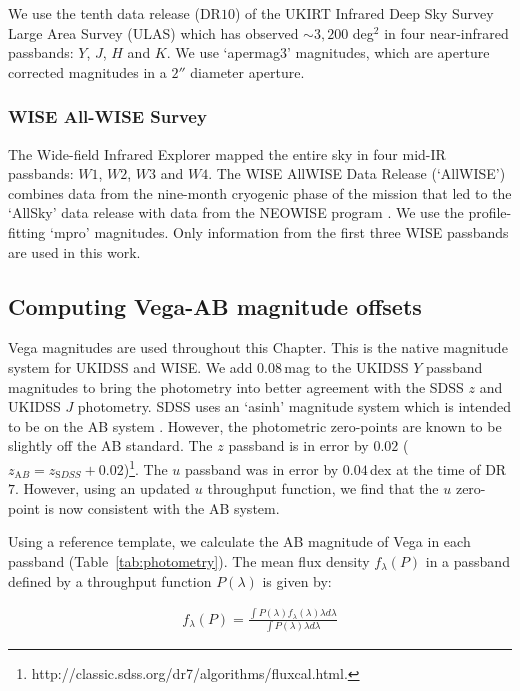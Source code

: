 We use the tenth data release (DR$10$) of the UKIRT Infrared Deep Sky Survey \citep[UKIDSS;][]{lawrence07} Large Area Survey (ULAS) which has observed $\sim 3,200$ deg$^2$ in four near-infrared passbands: $Y$, $J$, $H$ and $K$. 
We use `apermag3' magnitudes, which are aperture corrected magnitudes in a $2''$ diameter aperture.

\subsubsection{WISE All-WISE Survey}

The Wide-field Infrared Explorer \citep[WISE;][]{wright10} mapped the entire sky in four mid-IR passbands: $W1$, $W2$, $W3$ and $W4$. 
The WISE AllWISE Data Release (`AllWISE') combines data from the nine-month cryogenic phase of the mission that led to the `AllSky' data release with data from the NEOWISE program \citep{mainzer11}. 
We use the profile-fitting `mpro' magnitudes.   
Only information from the first three WISE passbands are used in this work.

\subsection{Computing Vega-AB magnitude offsets}

Vega magnitudes are used throughout this Chapter. 
This is the native magnitude system for UKIDSS and WISE.
We add $0.08$\,mag to the UKIDSS $Y$ passband magnitudes to bring the photometry into better agreement with the SDSS $z$ and UKIDSS $J$ photometry. 
SDSS uses an `asinh' magnitude system \citep{lupton99} which is intended to be on the AB system \citep{oke83}.
However, the photometric zero-points are known to be slightly off the AB standard. 
The $z$ passband is in error by $0.02$ ($z_{\mathrm AB} = z_{\mathrm SDSS} + 0.02$)\footnote{http://classic.sdss.org/dr7/algorithms/fluxcal.html.}.
The $u$ passband was in error by $0.04$\,dex at the time of DR$7$. 
However, using an updated $u$ throughput function, we find that the $u$ zero-point is now consistent with the AB system. 

Using a reference template, we calculate the AB magnitude of Vega in each passband (Table~\ref{tab:photometry}). 
The mean flux density $f_\lambda(P)$ in a passband defined by a throughput function $P(\lambda)$ is given by: 

\begin{eqnarray}
\label{eq:flux}
  f_\lambda(P) = \frac {\int P(\lambda)f_\lambda(\lambda)\lambda d\lambda} {\int P(\lambda)\lambda d\lambda} 
\end{eqnarray}

